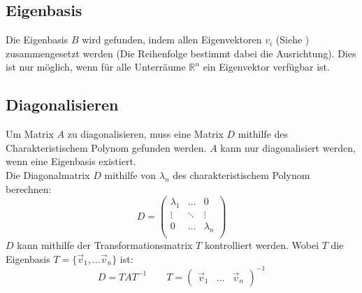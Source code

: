 \subsection{Eigenbasis}\label{eigenbasis}
Die Eigenbasis $B$ wird gefunden, indem allen Eigenvektoren $v_i$ (Siehe ) zusammengesetzt werden (Die Reihenfolge bestimmt dabei die Ausrichtung). Dies ist nur möglich, wenn für alle Unterräume $\mathbb{R}^n$ ein Eigenvektor verfügbar ist.

\subsection{Diagonalisieren}\label{diagonalisieren}
Um Matrix $A$ zu diagonalisieren, muss eine Matrix $D$ mithilfe des Charakteristischem Polynom gefunden werden. $A$ kann nur diagonalisiert werden, wenn eine Eigenbasis existiert. \\
Die Diagonalmatrix $D$ mithilfe von $\lambda_n$ des charakteristischem Polynom berechnen:
\[D = \begin{pmatrix}
	\lambda_1 & \dots & 0 \\
	\vdots & \ddots & \vdots \\
	0 & \dots & \lambda_n \\
\end{pmatrix}\]
\noindent $D$ kann mithilfe der Transformationsmatrix $T$ kontrolliert werden.  Wobei $T$ die Eigenbasis $T = \{\vec{v}_1,\dots\vec{v}_n\}$ ist:
\[
D = TAT^{-1} \qquad T = \begin{pmatrix}
	\vec{v}_1 & \dots & \vec{v}_n
\end{pmatrix}^{-1}\]